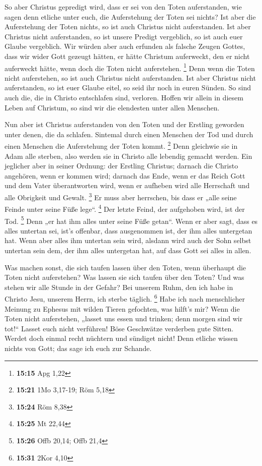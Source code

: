  So aber Christus gepredigt wird, dass er sei von den
Toten auferstanden, wie sagen denn etliche unter euch, die Auferstehung
der Toten sei nichts?  Ist aber die Auferstehung der
Toten nichts, so ist auch Christus nicht auferstanden. 
Ist aber Christus nicht auferstanden, so ist unsere Predigt vergeblich,
so ist auch euer Glaube vergeblich.  Wir würden aber auch
erfunden als falsche Zeugen Gottes, dass wir wider Gott gezeugt hätten,
er hätte Christum auferweckt, den er nicht auferweckt hätte, wenn doch
die Toten nicht auferstehen. \footnote{\textbf{15:15} Apg 1,22}
 Denn wenn die Toten nicht auferstehen, so ist auch
Christus nicht auferstanden.  Ist aber Christus nicht
auferstanden, so ist euer Glaube eitel, so seid ihr noch in euren
Sünden.  So sind auch die, die in Christo entschlafen
sind, verloren.  Hoffen wir allein in diesem Leben auf
Christum, so sind wir die elendesten unter allen Menschen.

 Nun aber ist Christus auferstanden von den Toten und der
Erstling geworden unter denen, die da schlafen.  Sintemal
durch einen Menschen der Tod und durch einen Menschen die Auferstehung
der Toten kommt. \footnote{\textbf{15:21} 1Mo 3,17-19; Röm 5,18}
 Denn gleichwie sie in Adam alle sterben, also werden sie
in Christo alle lebendig gemacht werden.  Ein jeglicher
aber in seiner Ordnung: der Erstling Christus; darnach die Christo
angehören, wenn er kommen wird;  darnach das Ende, wenn
er das Reich Gott und dem Vater überantworten wird, wenn er aufheben
wird alle Herrschaft und alle Obrigkeit und Gewalt. \footnote{\textbf{15:24}
  Röm 8,38}  Er muss aber herrschen, bis dass er „alle
seine Feinde unter seine Füße lege``. \footnote{\textbf{15:25} Mt 22,44}
 Der letzte Feind, der aufgehoben wird, ist der Tod.
\footnote{\textbf{15:26} Offb 20,14; Offb 21,4}  Denn „er
hat ihm alles unter seine Füße getan``. Wenn er aber sagt, dass es alles
untertan sei, ist's offenbar, dass ausgenommen ist, der ihm alles
untergetan hat.  Wenn aber alles ihm untertan sein wird,
alsdann wird auch der Sohn selbst untertan sein dem, der ihm alles
untergetan hat, auf dass Gott sei alles in allen.

 Was machen sonst, die sich taufen lassen über den Toten,
wenn überhaupt die Toten nicht auferstehen? Was lassen sie sich taufen
über den Toten?  Und was stehen wir alle Stunde in der
Gefahr?  Bei unserem Ruhm, den ich habe in Christo Jesu,
unserem Herrn, ich sterbe täglich. \footnote{\textbf{15:31} 2Kor 4,10}
 Habe ich nach menschlicher Meinung zu Ephesus mit wilden
Tieren gefochten, was hilft's mir? Wenn die Toten nicht auferstehen,
„lasset uns essen und trinken; denn morgen sind wir tot!{}``
 Lasset euch nicht verführen! Böse Geschwätze verderben
gute Sitten.  Werdet doch einmal recht nüchtern und
sündiget nicht! Denn etliche wissen nichts von Gott; das sage ich euch
zur Schande.

